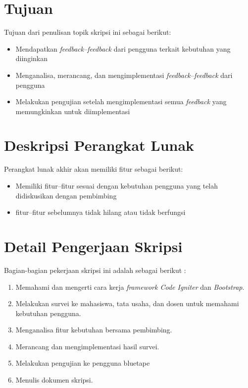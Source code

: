\documentclass[a4paper,twoside]{article}
\begin{document}
\section{Tujuan}
Tujuan dari penulisan topik skripsi ini sebagai berikut:
\begin{itemize}
	\item Mendapatkan \textit{feedback--feedback} dari pengguna terkait kebutuhan yang diinginkan
	\item Menganalisa, merancang, dan mengimplementasi \textit{feedback--feedback} dari pengguna
	\item Melakukan pengujian setelah mengimplementasi semua \textit{feedback} yang memungkinkan untuk diimplementasi
\end{itemize}


\newpage
\section{Deskripsi Perangkat Lunak}

Perangkat lunak akhir akan memiliki fitur sebagai berikut:
\begin{itemize}
	\item Memiliki fitur--fitur sesuai dengan kebutuhan pengguna yang telah didiskusikan dengan pembimbing
	\item fitur--fitur sebelumnya tidak hilang atau tidak berfungsi 
	
\end{itemize}

\section{Detail Pengerjaan Skripsi}

Bagian-bagian pekerjaan skripsi ini adalah sebagai berikut :
	\begin{enumerate}
		\item Memahami dan mengerti cara kerja \textit{framework Code Igniter} dan \textit{Bootstrap}.
		\item Melakukan survei ke mahasiswa, tata usaha, dan dosen untuk memahami kebutuhan pengguna.
		\item Menganalisa fitur kebutuhan bersama pembimbing.
		\item Merancang dan mengimplementasi hasil survei.	
		\item Melakukan pengujian ke pengguna bluetape
		\item Menulis dokumen skripsi.
	\end{enumerate}
\end{document}
